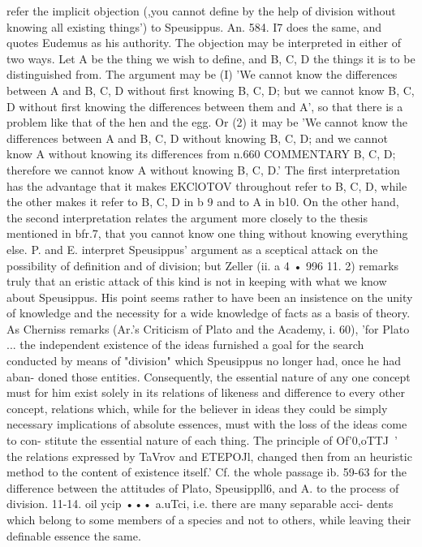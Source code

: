 {{{{{{{{{{{{{{{{{{{{{{{{{{{{{{{{{{{{{{{{{{{{{{{{{{{{{{{{{{{{{{{{{{{refer the implicit objection (,you cannot define by the help of
division without knowing all existing things') to Speusippus. An.
584. I7 does the same, and quotes Eudemus as his authority. The
objection may be interpreted in either of two ways. Let A be
the thing we wish to define, and B, C, D the things it is to be
distinguished from. The argument may be (I) 'We cannot know
the differences between A and B, C, D without first knowing
B, C, D; but we cannot know B, C, D without first knowing the
differences between them and A', so that there is a problem like
that of the hen and the egg. Or (2) it may be 'We cannot know
the differences between A and B, C, D without knowing B, C, D;
and we cannot know A without knowing its differences from
n.660
COMMENTARY
B, C, D; therefore we cannot know A without knowing B, C, D.'
The first interpretation has the advantage that it makes EKClOTOV
throughout refer to B, C, D, while the other makes it refer to
B, C, D in b 9 and to A in b10. On the other hand, the second
interpretation relates the argument more closely to the thesis
mentioned in bfr.7, that you cannot know one thing without
knowing everything else.
P. and E. interpret Speusippus' argument as a sceptical attack
on the possibility of definition and of division; but Zeller
(ii. a 4 • 996 11. 2) remarks truly that an eristic attack of this kind
is not in keeping with what we know about Speusippus. His point
seems rather to have been an insistence on the unity of knowledge
and the necessity for a wide knowledge of facts as a basis of
theory. As Cherniss remarks (Ar.'s Criticism of Plato and the
Academy, i. 60), 'for Plato ... the independent existence of the
ideas furnished a goal for the search conducted by means of
"division" which Speusippus no longer had, once he had aban-
doned those entities. Consequently, the essential nature of any
one concept must for him exist solely in its relations of likeness
and difference to every other concept, relations which, while for
the believer in ideas they could be simply necessary implications
of absolute essences, must with the loss of the ideas come to con-
stitute the essential nature of each thing. The principle of Of'0,oTTJ~'
the relations expressed by TaVrov and ETEPOJl, changed then from an
heuristic method to the content of existence itself.' Cf. the whole
passage ib. 59-63 for the difference between the attitudes of Plato,
Speusippll6, and A. to the process of division.
11-14. oil ycip ••• a.uTci, i.e. there are many separable acci-
dents which belong to some members of a species and not to
others, while leaving their definable essence the same.
}}}}}}}}}}}}}}}}}}}}}}}}}}}}}}}}}}}}}}}}}}}}}}}}}}}}}}}}}}}}}}}}}}}
